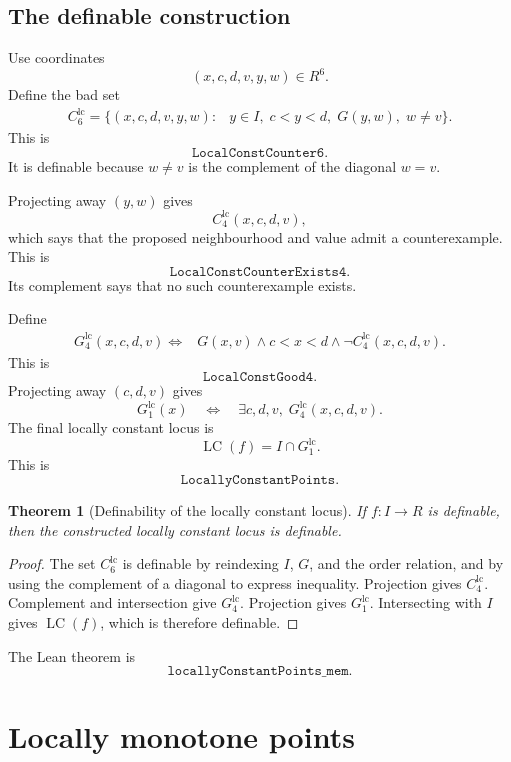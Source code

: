 \documentclass[11pt]{article}
\newtheorem{theorem}[definition]{Theorem}
\newcommand{\LC}{\operatorname{LC}}
\newcommand{\Lean}[1]{\texttt{#1}}
\begin{document}
\subsection{The definable construction}

Use coordinates
\[
  (x,c,d,v,y,w)
  \in R^6.
\]
Define the bad set
\[
\begin{aligned}
  C^{\mathrm{lc}}_6=\bigl\{(x,c,d,v,y,w):{}&
  y\in I,
  \;c<y<d,
  \;G(y,w),
  \;w\ne v
  \bigr\}.
\end{aligned}
\]
This is
\[
  \Lean{LocalConstCounter6}.
\]
It is definable because $w\ne v$ is the complement of the diagonal $w=v$.

Projecting away $(y,w)$ gives
\[
  C^{\mathrm{lc}}_4(x,c,d,v),
\]
which says that the proposed neighbourhood and value admit a counterexample.  This is
\[
  \Lean{LocalConstCounterExists4}.
\]
Its complement says that no such counterexample exists.

Define
\[
\begin{aligned}
  G^{\mathrm{lc}}_4(x,c,d,v)
  \Longleftrightarrow{}&
  G(x,v)
  \land c<x<d
  \land \neg C^{\mathrm{lc}}_4(x,c,d,v).
\end{aligned}
\]
This is
\[
  \Lean{LocalConstGood4}.
\]
Projecting away $(c,d,v)$ gives
\[
  G^{\mathrm{lc}}_1(x)
  \quad\Longleftrightarrow\quad
  \exists c,d,v,
  \;G^{\mathrm{lc}}_4(x,c,d,v).
\]
The final locally constant locus is
\[
  \LC(f)=I\cap G^{\mathrm{lc}}_1.
\]
This is
\[
  \Lean{LocallyConstantPoints}.
\]

\begin{theorem}[Definability of the locally constant locus]
If $f:I\to R$ is definable, then the constructed locally constant locus is definable.
\end{theorem}

\begin{proof}
The set $C^{\mathrm{lc}}_6$ is definable by reindexing $I$, $G$, and the order relation, and by using
the complement of a diagonal to express inequality.  Projection gives $C^{\mathrm{lc}}_4$.  Complement
and intersection give $G^{\mathrm{lc}}_4$.  Projection gives $G^{\mathrm{lc}}_1$.  Intersecting with
$I$ gives $\LC(f)$, which is therefore definable.
\end{proof}

The Lean theorem is
\[
  \Lean{locallyConstantPoints\_mem}.
\]

\section{Locally monotone points}
\end{document}
